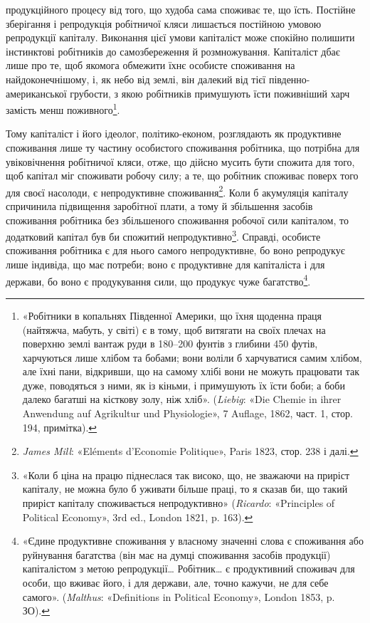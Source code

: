 \parcont{}  %
продукційного процесу від того, що худоба сама споживає
те, що їсть. Постійне зберігання і репродукція робітничої кляси
лишається постійною умовою репродукції капіталу. Виконання
цієї умови капіталіст може спокійно полишити інстинктові
робітників до самозбереження й розмножування. Капіталіст
дбає лише про те, щоб якомога обмежити їхнє особисте споживання
на найдоконечнішому, і, як небо від землі, він далекий від
тієї південно-американської грубости, з якою робітників примушують
їсти поживніший харч замість менш поживного\footnote{
«Робітники в копальнях Південної Америки, що їхня щоденна
праця (найтяжча, мабуть, у світі) є в тому, щоб витягати на своїх плечах
на поверхню землі вантаж руди в 180--200 фунтів з глибини 450 футів,
харчуються лише хлібом та бобами; вони воліли б харчуватися
самим хлібом, але їхні пани, відкривши, що на самому хлібі вони не
можуть працювати так дуже, поводяться з ними, як із кіньми, і примушують
їх їсти боби; а боби далеко багатші на кісткову золу, ніж хліб».
(\emph{Liebig}: «Die Chemie in ihrer Anwendung auf Agrikultur und Physiologie»,
7 Auflage, 1862, част. 1, стор. 194, примітка).
}.

Тому капіталіст і його ідеолог, політико-економ, розглядають
як продуктивне споживання лише ту частину особистого споживання
робітника, що потрібна для увіковічнення робітничої
кляси, отже, що дійсно мусить бути спожита для того, щоб капітал
міг споживати робочу силу; а те, що робітник споживає поверх
того для своєї насолоди, є непродуктивне споживання\footnote{
\emph{James Mill}: «Eléments d’Economie Politique», Paris 1823, стор. 238
і далі.
}.
Коли б акумуляція капіталу спричинила підвищення заробітної
плати, а тому й збільшення засобів споживання робітника без
збільшеного споживання робочої сили капіталом, то додатковий
капітал був би спожитий непродуктивно\footnote{
«Коли б ціна на працю піднеслася так високо, що, не зважаючи
на приріст капіталу, не можна було б уживати більше праці, то я сказав
би, що такий приріст капіталу споживається непродуктивно» (\emph{Ricardo}:
«Principles of Political Economy», 3rd ed., London 1821, p. 163).
}. Справді, особисте
споживання робітника є для нього самого непродуктивне, бо воно
репродукує лише індивіда, що має потреби; воно є продуктивне
для капіталіста і для держави, бо воно є продукування сили,
що продукує чуже багатство\footnote{
«Єдине продуктивне споживання у власному значенні слова є
споживання або руйнування багатства (він має на думці споживання
засобів продукції) капіталістом з метою репродукції\dots{} Робітник\dots{} є
продуктивний споживач для особи, що вживає його, і для держави, але,
точно кажучи, не для себе самого». (\emph{Malthus}: «Definitions in Political
Economy», London 1853, p. ЗО).
}.

